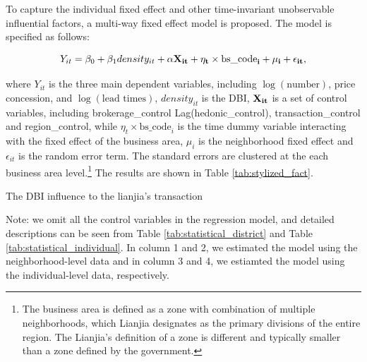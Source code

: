 \documentclass[11pt]{article}
\begin{document}
To capture the individual fixed effect and other time-invariant unobservable influential factors, a multi-way fixed effect model is proposed. The model is specified as follows: 

\begin{equation}
  Y_{it} = \beta_0 + \beta_1 density_{it} + \bf{\alpha} \bf{X}_{it} + \eta_{t} \times \text{bs\_code}_i + \mu_i + \epsilon_{it}, \label{eq:multi-way-fe}
\end{equation}

where $Y_{it}$ is the three main dependent variables, including $\log(\text{number})$, price concession, and $\log(\text{lead times})$, $density_{it}$ is the DBI, $\bf{X}_{it}$ is a set of control variables, including brokerage\_control Lag(hedonic\_control), transaction\_control and region\_control, while $\eta_{t} \times \text{bs\_code}_i$ is the time dummy variable interacting with the fixed effect of the business area, $\mu_i$ is the neighborhood fixed effect and $\epsilon_{it}$ is the random error term. The standard errors are clustered at the each business area level.\footnote{The business area is defined as a zone with combination of multiple neighborhoods, which Lianjia designates as the primary divisions of the entire region. The Lianjia's definition of a zone is different and typically smaller than a zone defined by the government.} The results are shown in Table \ref{tab:stylized_fact}.

\begin{table}[htb!]
    \centering
    \begin{scriptsize}
    
    \caption{The DBI influence to the lianjia's transaction}

    Note: we omit all the control variables in the regression model, and detailed descriptions can be seen from Table \ref{tab:statistical_district} and Table \ref{tab:statistical_individual}. In column 1 and 2, we estimated the model using the neighborhood-level data and in column 3 and 4, we estiamted the model using the individual-level data, respectively. 
    \label{tab:stylized_fact}
    \end{scriptsize}
\end{table}
\end{document}
